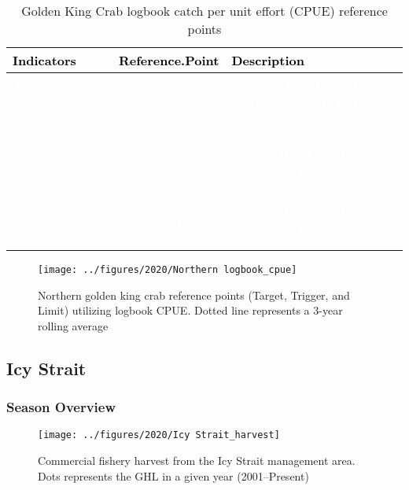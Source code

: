 \documentclass[]{article}
\begin{document}
\begin{table}[!h]

\caption{\label{tab:unnamed-chunk-3}Golden King Crab logbook catch per unit effort (CPUE) reference points}
\centering
\begin{tabular}[t]{l|l|l}
\hline
\textcolor{black}{\textbf{Indicators}} & \textcolor{black}{\textbf{Reference.Point}} & \textcolor{black}{\textbf{Description}}\\
\hline
\rowcolor{gray!6}  \rowcolor{olive}  \textcolor{white}{\textbf{Target Reference Point}} & \textcolor{white}{\textbf{2.7 crab/pot}} & \textcolor{white}{\textbf{Average Commercial Logbook CPUE from 2000-2017}}\\
\hline
\rowcolor{orange}  \textcolor{white}{\textbf{Trigger Reference Point}} & \textcolor{white}{\textbf{2.0 crab/pot}} & \textcolor{white}{\textbf{75\% of the Target Reference Point}}\\
\hline
\rowcolor{gray!6}  \rowcolor{red}  \textcolor{white}{\textbf{Limit Reference Point}} & \textcolor{white}{\textbf{1.3 crab/pot}} & \textcolor{white}{\textbf{50\% of the Target Reference Point}}\\
\hline
\end{tabular}
\end{table}

\begin{figure}[H]
\texttt{[image: ../figures/2020/Northern logbook\_cpue]} \caption{Northern golden king crab reference points (Target, Trigger, and Limit) utilizing logbook CPUE. Dotted line represents a 3-year rolling average}\label{fig:unnamed-chunk-4}
\end{figure}

\subsection{Icy Strait}\label{icy-strait}

\subsubsection{Season Overview}\label{season-overview-1}

\begin{figure}[H]
\texttt{[image: ../figures/2020/Icy Strait\_harvest]} \caption{Commercial fishery harvest from the Icy Strait management area. Dots represents the GHL in a given year (2001–Present)}\label{fig:unnamed-chunk-5}
\end{figure}
\end{document}
